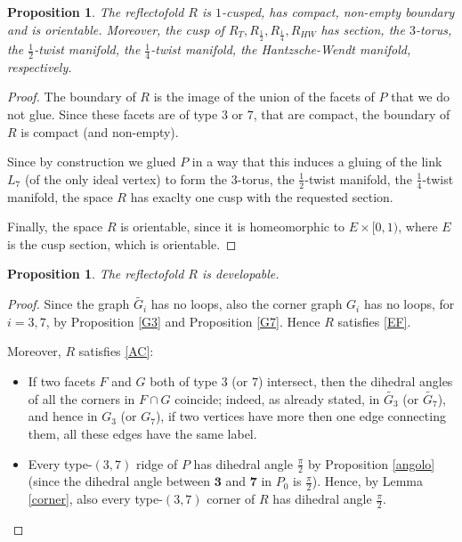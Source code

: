 \documentclass{amsart}
\newtheorem{prop}[lemma]{Proposition}
\theoremstyle{definition}
\theoremstyle{remark}
\newcommand{\matR} {\ensuremath {\mathbb{R}}}
\begin{document}
\begin{prop}
\label{cusp}
    The reflectofold $R$ is $1$-cusped, has compact, non-empty boundary and is orientable. Moreover, the cusp of $R_T, R_{\frac{1}{2}},R_{\frac{1}{4}}, R_{HW}$ has section, the $3$-torus, the $\frac{1}{2}$-twist manifold, the $\frac{1}{4}$-twist manifold, the Hantzsche-Wendt manifold, respectively.
\end{prop}
\begin{proof}
    The boundary of $R$ is the image of the union of the facets of $P$ that we do not glue. Since these facets are of type $3$ or $7$, that are compact, the boundary of $R$ is compact (and non-empty).

    Since by construction we glued $P$ in a way that this induces a gluing of the link $L_7$ (of the only ideal vertex) to form the $3$-torus, the $\frac{1}{2}$-twist manifold, the $\frac{1}{4}$-twist manifold, the space $R$ has exaclty one cusp with the requested section.

    Finally, the space $R$ is orientable, since it is homeomorphic to $E\times [0,1)$, where $E$ is the cusp section, which is orientable.
\end{proof}


\begin{prop}
\label{proprieta}
    The reflectofold $R$ is developable.
\end{prop}
\begin{proof}
    Since the graph $\widetilde{G_i}$ has no loops, also the corner graph $G_i$ has no loops, for $i=3,7$, by Proposition \ref{G3} and Proposition \ref{G7}. Hence $R$ satisfies \ref{EF}.

    Moreover, $R$ satisfies \ref{AC}:
    \begin{itemize}
        \item If two facets $F$ and $G$ both of type $3$ (or $7$) intersect, then the dihedral angles of all the corners in $F \cap G$ coincide; indeed, as already stated, in $\widetilde{G_3}$ (or $\widetilde{G_7}$), and hence in $G_3$ (or $G_7$), if two vertices have more then one edge connecting them, all these edges have the same label.
        \item Every type-$(3,7)$ ridge of $P$ has dihedral angle $\frac{\pi}{2}$ by Proposition \ref{angolo} (since the dihedral angle between $\textbf{3}$ and $\textbf{7}$ in $P_0$ is $\frac{\pi}{2}$). Hence, by Lemma \ref{corner}, also every type-$(3,7)$ corner of $R$ has dihedral angle $\frac{\pi}{2}$.
    \end{itemize}
\end{proof}
\end{document}
